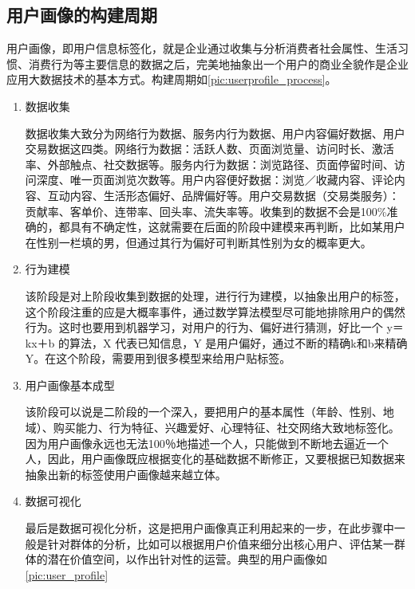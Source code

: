 		\subsection{用户画像的构建周期}
		用户画像，即用户信息标签化，就是企业通过收集与分析消费者社会属性、生活习惯、消费行为等主要信息的数据之后，完美地抽象出一个用户的商业全貌作是企业应用大数据技术的基本方式。构建周期如\autoref{pic:userprofile_process}。
		\begin{figure}
	    \centering
	      \label{pic:userprofile_process}
	    \end{figure}
	    \begin{enumerate}[(1)]
	    \item 数据收集

	    数据收集大致分为网络行为数据、服务内行为数据、用户内容偏好数据、用户交易数据这四类。网络行为数据：活跃人数、页面浏览量、访问时长、激活率、外部触点、社交数据等。服务内行为数据：浏览路径、页面停留时间、访问深度、唯一页面浏览次数等。用户内容便好数据：浏览／收藏内容、评论内容、互动内容、生活形态偏好、品牌偏好等。用户交易数据（交易类服务）：贡献率、客单价、连带率、回头率、流失率等。收集到的数据不会是100\%准确的，都具有不确定性，这就需要在后面的阶段中建模来再判断，比如某用户在性别一栏填的男，但通过其行为偏好可判断其性别为女的概率更大。
	    \item 行为建模

	    该阶段是对上阶段收集到数据的处理，进行行为建模，以抽象出用户的标签，这个阶段注重的应是大概率事件，通过数学算法模型尽可能地排除用户的偶然行为。这时也要用到机器学习，对用户的行为、偏好进行猜测，好比一个 y＝kx＋b 的算法，X 代表已知信息，Y 是用户偏好，通过不断的精确k和b来精确Y。在这个阶段，需要用到很多模型来给用户贴标签。
	    \item 用户画像基本成型

	    该阶段可以说是二阶段的一个深入，要把用户的基本属性（年龄、性别、地域）、购买能力、行为特征、兴趣爱好、心理特征、社交网络大致地标签化。因为用户画像永远也无法100％地描述一个人，只能做到不断地去逼近一个人，因此，用户画像既应根据变化的基础数据不断修正，又要根据已知数据来抽象出新的标签使用户画像越来越立体。
	    \item 数据可视化

	    最后是数据可视化分析，这是把用户画像真正利用起来的一步，在此步骤中一般是针对群体的分析，比如可以根据用户价值来细分出核心用户、评估某一群体的潜在价值空间，以作出针对性的运营。典型的用户画像如\autoref{pic:user_profile}
	    \end{enumerate}

